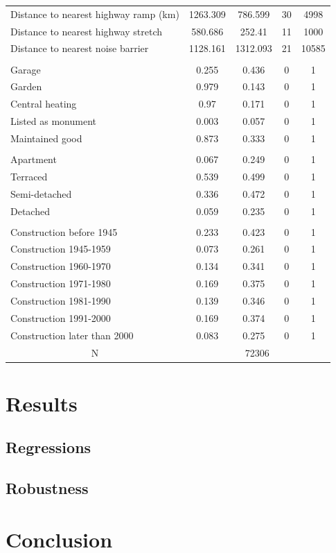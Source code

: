 \documentclass[12pt,a4paper]{scrartcl}
\begin{document}
\begin{table}[htbp]
\begin{tabular}{l c c c c }
Distance to nearest highway ramp (km) & 1263.309 & 786.599 & 30 & 4998 \\
Distance to nearest highway stretch & 580.686 & 252.41 & 11 & 1000 \\
Distance to nearest noise barrier & 1128.161 & 1312.093 & 21 & 10585 \\
\\
Garage & 0.255 & 0.436 & 0 & 1 \\
Garden & 0.979 & 0.143 & 0 & 1 \\
Central heating & 0.97 & 0.171 & 0 & 1 \\
Listed as monument & 0.003 & 0.057 & 0 & 1 \\
Maintained good & 0.873 & 0.333 & 0 & 1 \\
\\
Apartment & 0.067 & 0.249 & 0 & 1 \\
Terraced & 0.539 & 0.499 & 0 & 1 \\
Semi-detached & 0.336 & 0.472 & 0 & 1 \\
Detached & 0.059 & 0.235 & 0 & 1 \\
\\
Construction before 1945 & 0.233 & 0.423 & 0 & 1 \\
Construction 1945-1959 & 0.073 & 0.261 & 0 & 1 \\
Construction 1960-1970 & 0.134 & 0.341 & 0 & 1 \\
Construction 1971-1980 & 0.169 & 0.375 & 0 & 1 \\
Construction 1981-1990 & 0.139 & 0.346 & 0 & 1 \\
Construction 1991-2000 & 0.169 & 0.374 & 0 & 1 \\
Construction later than 2000 & 0.083 & 0.275 & 0 & 1 \\
\multicolumn{1}{c}{N} & \multicolumn{4}{c}{72306}\\ \hline
\end{tabular}
\end{table}



       
	
	\section{Results}
	\label{sec:results}
	
		\subsection{Regressions}
	
		\subsection{Robustness}
	
	\section{Conclusion}
	\label{sec:conclusion}
	
	
	
	
	
\end{document}
